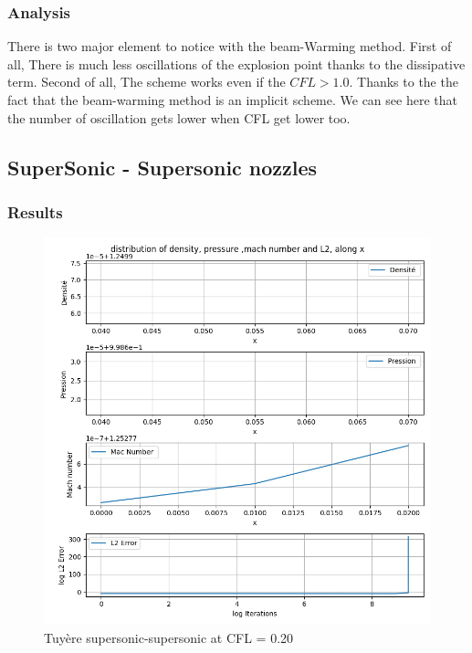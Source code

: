 \documentclass[12pt]{article}
\begin{document}
\subsubsection{Analysis}

There is two major element to notice with the beam-Warming method. First of all, There is much less oscillations
of the explosion point thanks to the dissipative term. Second of all, The scheme works even if the $CFL > 1.0$. Thanks to the 
the fact that the beam-warming method is an implicit scheme. We can see here that the number of oscillation gets lower when
CFL get lower too. 

\subsection{SuperSonic - Supersonic nozzles}


\subsubsection{Results}
\begin{figure}[H] %
    \centering
    \includegraphics[width=\textwidth,height=\textheight,keepaspectratio]{PLOTS/nozzle_super_super_Beam_CFL020.png}
    \caption{Tuyère supersonic-supersonic at CFL = 0.20}
    \label{fig:your_label}
\end{figure}
\end{document}
